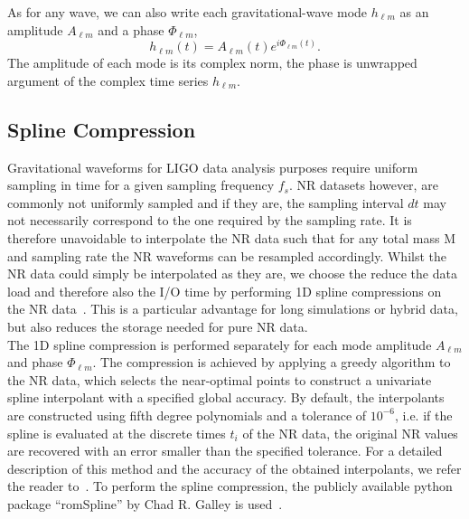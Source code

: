 \documentclass[aps,prd,amssymb,amsmath,amsfonts,superscriptaddress,
floatfix ,preprintnumbers,altaffilletter]{revtex4}
\begin{document}
As for any wave, we can also write each gravitational-wave mode $h_{\ell m}$ as an amplitude $A_{\ell m}$ and a phase
$\Phi_{\ell m}$,
\begin{equation}
\label{ }
h_{\ell m}(t) = A_{\ell m}(t)e^{i\Phi_{\ell m}(t)}.
\end{equation}
The amplitude of each mode is its complex norm, the phase is unwrapped argument of the complex time series $h_{\ell m}$. 

\subsection{Spline Compression}
\label{sec:spline}
Gravitational waveforms for LIGO data analysis purposes require uniform sampling in time for a given sampling frequency $f_s$.
NR datasets however, are commonly not uniformly sampled and if they are, the sampling interval $dt$ may not necessarily
correspond to the one required by the sampling rate. It is therefore unavoidable to interpolate the NR data such that for any total
mass M and sampling rate the NR waveforms can be resampled accordingly. Whilst the NR data could simply be interpolated as
they are, we choose the reduce the data load and therefore also the I/O time by performing 1D spline compressions on the NR data~\cite{Galley:2015aa}. This is a particular advantage for long simulations or hybrid data, but also reduces the storage needed for pure NR data. \\

The 1D spline compression is performed separately for each mode amplitude $A_{\ell m}$ and phase $\Phi_{\ell m}$. The compression is
achieved by applying a greedy algorithm to the NR data, which selects the near-optimal points to construct a univariate spline interpolant
with a specified global accuracy. By default, the interpolants are constructed using fifth degree polynomials and a tolerance of $10^{-6}$,
i.e. if the spline is evaluated at the discrete times $t_i$ of the NR data, the original NR values are recovered with an error smaller than the
specified tolerance. For a detailed description of this method and the accuracy of the obtained interpolants, we refer the reader to~\cite{}. 
To perform the spline compression, the publicly available python package ``romSpline'' by Chad R. Galley is used~\cite{}. \\
\end{document}
